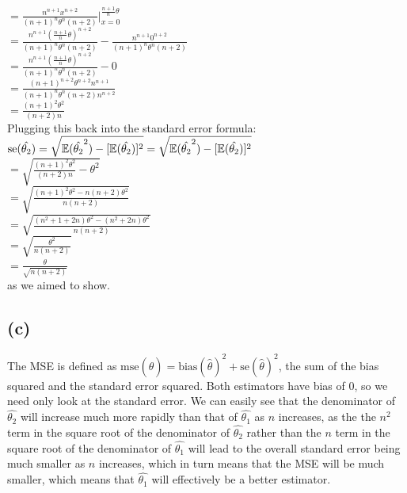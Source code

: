 \documentclass{article}
\begin{document}
{$= \frac{n^{n+1}x^{n+2}}{(n+1)^n\theta^n(n+2)} |_{x=0}^{\frac{n+1}{n}\theta} $ \\ 
$= \frac{n^{n+1}(\frac{n+1}{n}\theta)^{n+2}}{(n+1)^n\theta^n(n+2)} - \frac{n^{n+1}0^{n+2}}{(n+1)^n\theta^n(n+2)}$ \\ 
$= \frac{n^{n+1}(\frac{n+1}{n}\theta)^{n+2}}{(n+1)^n\theta^n(n+2)} - 0$ \\ 
$= \frac{(n+1)^{n+2}\theta^{n+2}n^{n+1}}{(n+1)^n\theta^n(n+2)n^{n+2}}$ \\ 
$= \frac{(n+1)^2\theta^2}{(n+2)n}$ \\ 
Plugging this back into the standard error formula: \\
$\text{se}(\hat{\theta_2}) = \sqrt{\mathbb{E}(\hat{\theta_2}^2) - [\mathbb{E}(\hat{\theta_2})]^2} \\
= \sqrt{\mathbb{E}(\hat{\theta_2}^2) - [\mathbb{E}(\hat{\theta_2})]^2}$ \\ 
$= \sqrt{\frac{(n+1)^2\theta^2}{(n+2)n} - \theta^2}$ \\
$= \sqrt{\frac{(n+1)^2\theta^2 - n(n+2)\theta^2}{n(n+2)}}$ \\
$= \sqrt{\frac{(n^2+1+2n)\theta^2 - (n^2+2n)\theta^2}{n(n+2)}}$ \\
$= \sqrt{\frac{\theta^2}{n(n+2)}}$ \\
$= \frac{\theta}{\sqrt{n(n+2)}}$ \\
as we aimed to show.
% 

\subsection*{(c)}

The MSE is defined as $\text{mse}(\hat{\theta}) = \text{bias}(\hat{\theta})^2 + \text{se}(\hat{\theta})^2$, the sum of the bias squared and the standard error squared. Both estimators have bias of 0, so we need only look at the standard error. We can easily see that the denominator of $\hat{\theta_2}$ will increase much more rapidly than that of $\hat{\theta_1}$ as $n$ increases, as the the $n^2$ term in the square root of the denominator of $\hat{\theta_2}$ rather than the $n$ term in the square root of the denominator of $\hat{\theta_1}$ will lead to the overall standard error being much smaller as $n$ increases, which in turn means that the MSE will be much smaller, which means that $\hat{\theta_1}$ will effectively be a better estimator.

}
\end{document}
